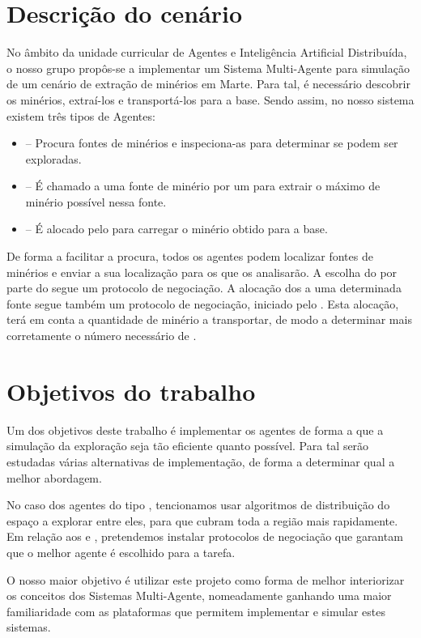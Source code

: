 \documentclass[12pt]{report}
\begin{document}
\section{Descrição do cenário}
No âmbito da unidade curricular de Agentes e Inteligência Artificial Distribuída, o nosso grupo propôs-se a implementar um Sistema Multi-Agente para simulação de um cenário de extração de minérios em Marte. Para tal, é necessário descobrir os minérios, extraí-los e transportá-los para a base. Sendo assim, no nosso sistema existem três tipos de Agentes:

\begin{itemize}
	\item \Spotter – Procura fontes de minérios e inspeciona-as para determinar se podem ser exploradas. 
	\item \Producer – É chamado a uma fonte de minério por um \spotter para extrair o máximo de minério possível nessa fonte. 
	\item \Transporter – É alocado pelo \producer para carregar o minério obtido para a base.
\end{itemize}

De forma a facilitar a procura, todos os agentes podem localizar fontes de minérios e enviar a sua localização para os \spotters que os analisarão. A escolha do \producer por parte do \spotter segue um protocolo de negociação. A alocação dos \transporters a uma determinada fonte segue também um protocolo de negociação, iniciado pelo \producer. Esta alocação, terá em conta a quantidade de minério a transportar, de modo a determinar mais corretamente o número necessário de \transporters.

\section{Objetivos do trabalho}

Um dos objetivos deste trabalho é implementar os agentes de forma a que a simulação da exploração seja tão eficiente quanto possível. Para tal serão estudadas várias alternativas de implementação, de forma a determinar qual a melhor abordagem. 

No caso dos agentes do tipo \spotter, tencionamos usar algoritmos de distribuição do espaço a explorar entre eles, para que cubram toda a região mais rapidamente. Em relação aos \producers e \transporters, pretendemos instalar protocolos de negociação que garantam que o melhor agente é escolhido para a tarefa.

O nosso maior objetivo é utilizar este projeto como forma de melhor interiorizar os conceitos dos Sistemas Multi-Agente, nomeadamente ganhando uma maior familiaridade com as plataformas que permitem implementar e simular estes sistemas.
\end{document}
